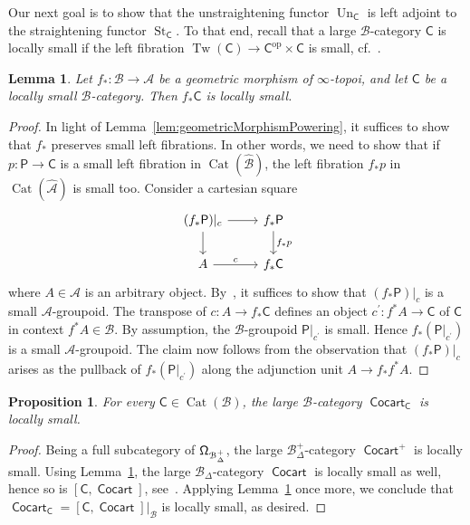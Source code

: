 \documentclass[reqno]{amsart}
\numberwithin{equation}{subsection}
\theoremstyle{plain}
\newtheorem{proposition}[equation]{Proposition}
\newtheorem{lemma}[equation]{Lemma}
\theoremstyle{definition}
\let\scr=\mathcal
\def\AA{\scr A}
\def\BB{\scr B}
\def\AAA{\widehat{\AA}}
\def\BBB{\widehat{\BB}}
\DeclareMathOperator{\Cat}{Cat}
\DeclareMathOperator{\ICocart}{\mathsf{Cocart}}
\DeclareMathOperator{\Tw}{Tw}
\DeclareMathOperator{\St}{St}
\DeclareMathOperator{\Un}{Un}
\newcommand{\op}{\mathrm{op}}
\newcommand{\I}[1]{\mathsf{#1}}
\newcommand{\iFun}[2]{{[#1,#2]}}
\newcommand{\Simp}[1]{#1_{\Delta}}
\newcommand{\mSimp}[1]{#1_{\Delta}^+}
\begin{document}
Our next goal is to show that the unstraightening functor $\Un_{\I{C}}$ is left adjoint to the straightening functor $\St_{\I{C}}$. To that end, recall that a large $\BB$-category $\I{C}$ is locally small if the left fibration $\Tw(\I{C})\to\I{C}^{\op}\times\I{C}$ is small, cf.~\cite[\S~4.7]{Martini2021}.
\begin{lemma}
	\label{lem:BaseChangeLocallySmall}
	Let $f_\ast\colon \BB\to\AA$ be a geometric morphism of $\infty$-topoi, and let $\I{C}$ be a locally small $\BB$-category. Then $f_\ast\I{C}$ is locally small.
\end{lemma}
\begin{proof}
	In light of Lemma~\ref{lem:geometricMorphismPowering}, it suffices to show that $f_\ast$ preserves small left fibrations. In other words, we need to show that if $p\colon \I{P}\to \I{C}$ is a small left fibration in $\Cat(\BBB)$, the left fibration $f_\ast p$ in $\Cat(\AAA)$ is small too. Consider a cartesian square
	\begin{equation*}
	\begin{tikzcd}
	(f_\ast\I{P})\vert_c\arrow[r]\arrow[d] & f_\ast \I{P}\arrow[d, "f_\ast p"]\\
	A\arrow[r, "c"] & f_\ast \I{C}
	\end{tikzcd}
	\end{equation*}
	where $A\in\AA$ is an arbitrary object. By~\cite[Proposition~4.7.2]{Martini2021}, it suffices to show that $(f_\ast\I{P})\vert_c$ is a small $\AA$-groupoid. The transpose of $c\colon A\to f_\ast\I{C}$ defines an object $c^\prime\colon f^\ast A\to\I{C}$ of $\I{C}$ in context $f^\ast A\in\BB$. By assumption, the $\BB$-groupoid $\I{P}\vert_{c^\prime}$ is small. Hence $f_\ast(\I{P}\vert_{c^\prime})$ is a small $\AA$-groupoid. The claim now follows from the observation that $(f_\ast\I{P})\vert_c$ arises as the pullback of $f_\ast(\I{P}\vert_{c^\prime})$ along the adjunction unit $A\to f_\ast f^\ast A$.
\end{proof}

\begin{proposition}
	\label{prop:CocartCLocallySmall}
	For every $\I{C}\in\Cat(\BB)$, the large $\BB$-category $\ICocart_{\I{C}}$ is locally small.
\end{proposition}
\begin{proof}
	Being a full subcategory of $\Univ[\mSimp\BB]$, the large $\mSimp\BB$-category $\ICocart^+$ is locally small. Using Lemma~\ref{lem:BaseChangeLocallySmall}, the large $\Simp\BB$-category $\ICocart$ is locally small as well, hence so is $\iFun{\I{C}}{\ICocart}$, see~\cite[Proposition~4.7.6]{Martini2021}. Applying Lemma~\ref{lem:BaseChangeLocallySmall} once more, we conclude that $\ICocart_{\I{C}}=\iFun{\I{C}}{\ICocart}\vert_{\BB}$ is locally small, as desired.
\end{proof}
\end{document}
